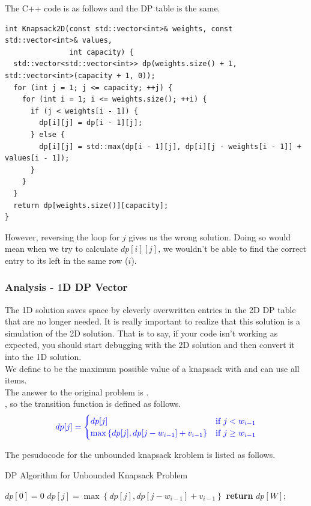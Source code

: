 The C++ code is as follows and the DP table is the same.
\begin{lstlisting}
int Knapsack2D(const std::vector<int>& weights, const std::vector<int>& values,
               int capacity) {
  std::vector<std::vector<int>> dp(weights.size() + 1, std::vector<int>(capacity + 1, 0));
  for (int j = 1; j <= capacity; ++j) {
    for (int i = 1; i <= weights.size(); ++i) {
      if (j < weights[i - 1]) {
        dp[i][j] = dp[i - 1][j];
      } else {
        dp[i][j] = std::max(dp[i - 1][j], dp[i][j - weights[i - 1]] + values[i - 1]);
      }
    }
  }
  return dp[weights.size()][capacity];
}
\end{lstlisting}

However, reversing the loop for $j$ gives us the wrong solution. Doing so would mean when we try to calculate $dp[i][j]$, we wouldn't be able to find the correct entry to its left in the same row ($i$).

\subsubsection{Analysis - $1$D DP Vector}
The 1D solution saves space by cleverly overwritten entries in the 2D DP table that are no longer needed. It is really important to realize that this solution is a simulation of the 2D solution. That is to say, if your code isn't working as expected, you should start debugging with the 2D solution and then convert it into the 1D solution.\\

We define {\color{blue}{$ dp[j] $}} to be the maximum possible value of a knapsack with {\color{blue}{capacity $ j $}} and can use all items.\\

The answer to the original problem is {\color{blue}{$ dp[W] $}}.\\

{\color{ForestGreen}{For each item $i$, we can choose to either put it into the knapsack or not}}, so the transition function is defined as follows.
\begin{equation}
{\color{blue}{
dp[j] = 
\begin{cases} 
    dp[j] & \text{if}\ j < w_{i-1}\\
    \max\left\{dp[j], dp[j - w_{i-1}] + v_{i-1}\right\} & \text{if}\ j \geq w_{i-1} 
\end{cases}
}}
\end{equation}

The pesudocode for the unbounded knapsack kroblem is listed as follows.
\begin{algorithm}[H]
\caption{DP Algorithm for Unbounded Knapsack Problem}
\begin{algorithmic}[1]
\State $dp[0] = 0$ 
\For{{\color{blue}{$i = 1$ to $n$}}}
    \For{{\color{blue}{$j = 1$ to $W$}}}
        \State $dp[j] = \max\left\{dp[j], dp[j - w_{i-1}] + v_{i-1}\right\} $ 
    \EndFor
\EndFor
\State \textbf{return} $dp[W]$;
\end{algorithmic}
\end{algorithm}

